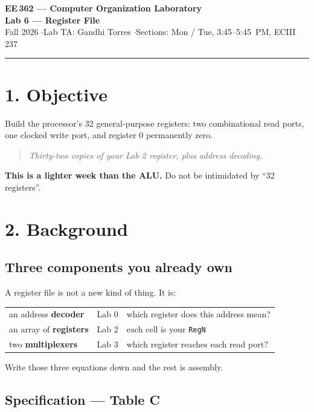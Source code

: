 \documentclass[11pt]{article}
\newcommand{\code}[1]{\texttt{#1}}
\newcommand{\hr}{\vspace{2pt}\hrule\vspace{6pt}}
\begin{document}
\begin{center}
{\Large\bfseries EE\,362 --- Computer Organization Laboratory}\\[2pt]
{\large\bfseries Lab 6 --- Register File}\\[4pt]
Fall 2026 \quad$\cdot$\quad Lab TA: Gandhi Torres \quad$\cdot$\quad Sections: Mon / Tue, 3:45--5:45~PM, ECIII 237
\end{center}
\hr

\section*{1. Objective}

Build the processor's 32 general-purpose registers: two combinational read
ports, one clocked write port, and register 0 permanently zero.

\begin{quote}
\emph{Thirty-two copies of your Lab 2 register, plus address decoding.}
\end{quote}

\textbf{This is a lighter week than the ALU.} Do not be intimidated by ``32
registers''.

\section*{2. Background}

\subsection*{Three components you already own}

A register file is not a new kind of thing. It is:

\begin{center}
\begin{tabular}{lll}
\toprule
an address \textbf{decoder} & Lab 0 & which register does this address mean? \\
an array of \textbf{registers} & Lab 2 & each cell is your \code{RegN} \\
two \textbf{multiplexers} & Lab 3 & which register reaches each read port? \\
\bottomrule
\end{tabular}
\end{center}

Write those three equations down and the rest is assembly.

\subsection*{Specification --- Table C}
\end{document}
